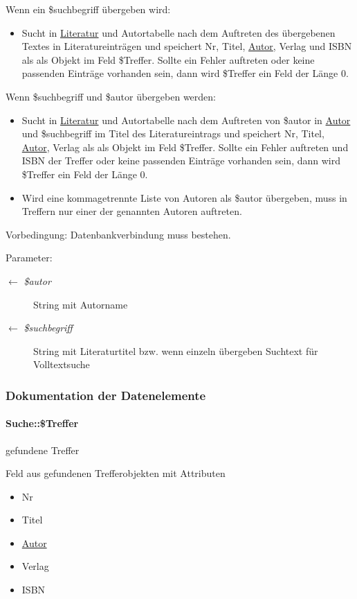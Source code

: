 Wenn ein \$suchbegriff übergeben wird:\begin{itemize}
\item Sucht in \hyperlink{classLiteratur}{Literatur} und Autortabelle nach dem Auftreten des übergebenen Textes in Literatureinträgen und speichert Nr, Titel, \hyperlink{classAutor}{Autor}, Verlag und ISBN als als Objekt im Feld \$Treffer. Sollte ein Fehler auftreten oder keine passenden Einträge vorhanden sein, dann wird \$Treffer ein Feld der Länge 0.\end{itemize}


Wenn \$suchbegriff und \$autor übergeben werden:\begin{itemize}
\item Sucht in \hyperlink{classLiteratur}{Literatur} und Autortabelle nach dem Auftreten von \$autor in \hyperlink{classAutor}{Autor} und \$suchbegriff im Titel des Literatureintrags und speichert Nr, Titel, \hyperlink{classAutor}{Autor}, Verlag als als Objekt im Feld \$Treffer. Sollte ein Fehler auftreten und ISBN der Treffer oder keine passenden Einträge vorhanden sein, dann wird \$Treffer ein Feld der Länge 0.\item Wird eine kommagetrennte Liste von Autoren als \$autor übergeben, muss in Treffern nur einer der genannten Autoren auftreten.\end{itemize}


\begin{Desc}
\item[Vorbedingung:]Datenbankverbindung muss bestehen. \end{Desc}
\begin{Desc}
\item[Parameter:]
\begin{description}
\item[\mbox{$\leftarrow$} {\em \$autor}]String mit Autorname \item[\mbox{$\leftarrow$} {\em \$suchbegriff}]String mit Literaturtitel bzw. wenn einzeln übergeben Suchtext für Volltextsuche \end{description}
\end{Desc}


\subsubsection{Dokumentation der Datenelemente}
\hypertarget{classSuche_0ee0e1ffb3f79392915fd39934d7140d}{
\paragraph[\$Treffer]{\setlength{\rightskip}{0pt plus 5cm}Suche::\$Treffer}\hfill}
\label{classSuche_0ee0e1ffb3f79392915fd39934d7140d}


gefundene Treffer 

Feld aus gefundenen Trefferobjekten mit Attributen\begin{itemize}
\item Nr\item Titel\item \hyperlink{classAutor}{Autor}\item Verlag\item ISBN \end{itemize}
